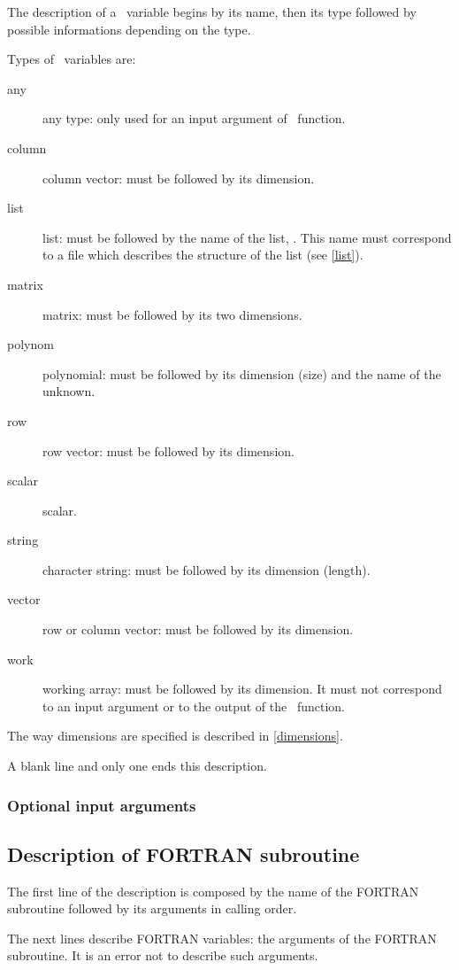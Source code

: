 The description of a \SCI\ variable begins by its name, then its type followed
by possible informations depending on the type.

Types of \SCI\ variables are:
\begin{description}
  \item[any] any type: only used for an input argument of \SCI\ function.
  \item[column] column vector: must be followed by its dimension.
  \item[list] list: must be followed by the name of the list,
. This name must correspond to a file 
which describes the structure of the list (see \ref{list}).
  \item[matrix] matrix: must be followed by its two dimensions.
  \item[polynom] polynomial: must be followed by its dimension (size) and the
name of the unknown.
  \item[row] row vector: must be followed by its dimension.
  \item[scalar] scalar.
  \item[string] character string: must be followed by its dimension
(length).
  \item[vector] row or column vector: must be followed by its dimension.
  \item[work] working array: must be followed by its dimension. It must not
correspond to an input argument or to the output of the \SCI\ function.
\end{description}

The way dimensions are specified is described in 
\ref{dimensions}.
\smallskip

A blank line and only one ends this description.

\subsubsection{Optional input arguments}

\subsection{Description of FORTRAN subroutine}
\label{fortran}

The first line of the description is composed by the name of the 
FORTRAN subroutine
followed by its arguments in calling order.

The next lines describe FORTRAN variables: the arguments of the FORTRAN
subroutine. 
It is an error not to describe such arguments.


